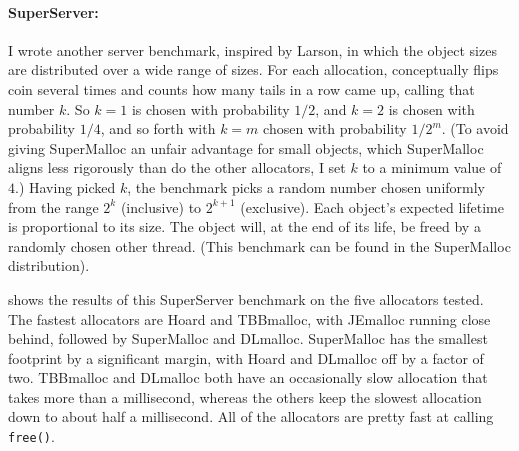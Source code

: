 \documentclass[natbib,sort&compress,10pt]{sigplanconf}
\newcommand{\code}[1]{\texttt{#1}}
\begin{document}
{\paragraph{SuperServer:}} I wrote another server benchmark, inspired
by Larson, in which the object sizes are distributed over a wide range
of sizes.  For each allocation, conceptually flips coin several times
and counts how many tails in a row came up, calling that number $k$.
So $k=1$ is chosen with probability $1/2$, and $k=2$ is chosen with
probability $1/4$, and so forth with $k=m$ chosen with probability
$1/2^m$.  (To avoid giving SuperMalloc an unfair advantage for small
objects, which SuperMalloc aligns less rigorously than do the other
allocators, I set $k$ to a minimum value of $4$.)  Having picked $k$,
the benchmark picks a random number chosen uniformly from the range
$2^k$ (inclusive) to $2^{k+1}$ (exclusive).  Each object's expected
lifetime is proportional to its size.  The object will, at the end of
its life, be freed by a randomly chosen other thread.  (This benchmark
can be found in the SuperMalloc distribution).

 shows the results of this SuperServer benchmark on the
five allocators tested.  The fastest allocators are Hoard and
TBBmalloc, with JEmalloc running close behind, followed by SuperMalloc
and DLmalloc.  SuperMalloc has the smallest footprint by a significant
margin, with Hoard and DLmalloc off by a factor of two.  TBBmalloc and
DLmalloc both have an occasionally slow allocation that takes more
than a millisecond, whereas the others keep the slowest allocation
down to about half a millisecond.  All of the allocators are pretty
fast at calling \code{free()}.
\end{document}
